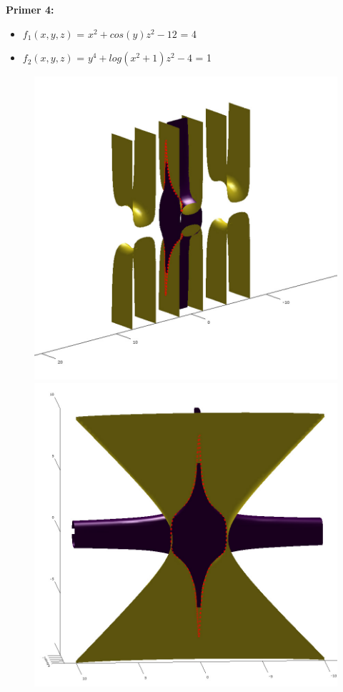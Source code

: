 \documentclass[12pt]{article}
\begin{document}
	\begin{minipage}{\textwidth}
	\textbf{\large{Primer 4:}}
	\begin{itemize}  
		\item $f_{1}(x,y,z)$ = $x^2 + cos(y)z^2 - 12$ = 4
		\item $f_{2}(x,y,z)$ = $y^4 + log(x^2 + 1)z^2 - 4$ = 1
	\end{itemize}
	\begin{figure}[H]
	    \centering
    	\includegraphics[scale=0.3]{primer4_1}
    	\includegraphics[scale=0.3]{primer4_2}

\end{figure}
\end{minipage}
\end{document}
